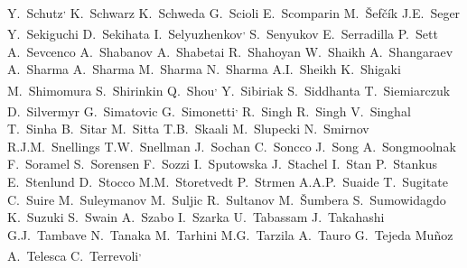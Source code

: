 \begin{flushleft}
Y.~Schutz\textsuperscript{,}\And 
K.~Schwarz\And 
K.~Schweda\And 
G.~Scioli\And 
E.~Scomparin\And 
M.~\v{S}ef\v{c}\'ik\And 
J.E.~Seger\And 
Y.~Sekiguchi\And 
D.~Sekihata\And 
I.~Selyuzhenkov\textsuperscript{,}\And 
S.~Senyukov\And 
E.~Serradilla\And 
P.~Sett\And 
A.~Sevcenco\And 
A.~Shabanov\And 
A.~Shabetai\And 
R.~Shahoyan\And 
W.~Shaikh\And 
A.~Shangaraev\And 
A.~Sharma\And 
A.~Sharma\And 
M.~Sharma\And 
N.~Sharma\And 
A.I.~Sheikh\And 
K.~Shigaki\And 
M.~Shimomura\And 
S.~Shirinkin\And 
Q.~Shou\textsuperscript{,}\And 
Y.~Sibiriak\And 
S.~Siddhanta\And 
T.~Siemiarczuk\And 
D.~Silvermyr\And 
G.~Simatovic\And 
G.~Simonetti\textsuperscript{,}\And 
R.~Singh\And 
R.~Singh\And 
V.~Singhal\And 
T.~Sinha\And 
B.~Sitar\And 
M.~Sitta\And 
T.B.~Skaali\And 
M.~Slupecki\And 
N.~Smirnov\And 
R.J.M.~Snellings\And 
T.W.~Snellman\And 
J.~Sochan\And 
C.~Soncco\And 
J.~Song\And 
A.~Songmoolnak\And 
F.~Soramel\And 
S.~Sorensen\And 
F.~Sozzi\And 
I.~Sputowska\And 
J.~Stachel\And 
I.~Stan\And 
P.~Stankus\And 
E.~Stenlund\And 
D.~Stocco\And 
M.M.~Storetvedt\And 
P.~Strmen\And 
A.A.P.~Suaide\And 
T.~Sugitate\And 
C.~Suire\And 
M.~Suleymanov\And 
M.~Suljic\And 
R.~Sultanov\And 
M.~\v{S}umbera\And 
S.~Sumowidagdo\And 
K.~Suzuki\And 
S.~Swain\And 
A.~Szabo\And 
I.~Szarka\And 
U.~Tabassam\And 
J.~Takahashi\And 
G.J.~Tambave\And 
N.~Tanaka\And 
M.~Tarhini\And 
M.G.~Tarzila\And 
A.~Tauro\And 
G.~Tejeda Mu\~{n}oz\And 
A.~Telesca\And 
C.~Terrevoli\textsuperscript{,}\And 

\end{flushleft}
